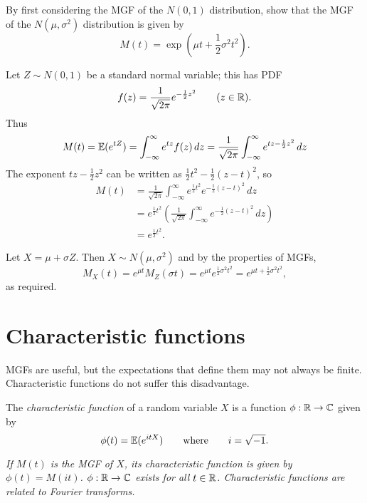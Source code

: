 \begin{example}
By first considering the MGF of the $N(0,1)$ distribution, show that the MGF of the $N(\mu,\sigma^2)$ distribution is given by
\[
M(t) = \exp\left(\mu t + \frac{1}{2}\sigma^2t^2\right).
\]
\end{example}

\begin{solution}
Let $Z\sim N(0,1)$ be a standard normal variable; this has PDF
\[
f(z) = \frac{1}{\sqrt{2\pi}}e^{-\frac{1}{2}z^2}\qquad (z\in\mathbb{R}).
\]
Thus
\[
M(t) = \mathbb{E}(e^{tZ})
	 = \int_{-\infty}^{\infty} e^{tz} f(z)\,dz 
	 = \frac{1}{\sqrt{2\pi}}\int_{-\infty}^{\infty} e^{tz-\frac{1}{2}z^2}\,dz 
\]
The exponent $tz-\frac{1}{2}z^2$ can be written as $\frac{1}{2}t^2 -\frac{1}{2}(z-t)^2$, so
\begin{align*}
M(t)
	& = \frac{1}{\sqrt{2\pi}}\int_{-\infty}^{\infty} e^{\frac{1}{2}t^2} e^{-\frac{1}{2}(z-t)^2}\,dz \\
	& = e^{\frac{1}{2}t^2} \left(\frac{1}{\sqrt{2\pi}}\int_{-\infty}^{\infty} e^{-\frac{1}{2}(z-t)^2}\,dz\right) \\
	& = e^{\frac{1}{2}t^2}.
\end{align*}

Let $X=\mu+\sigma Z$. Then $X\sim N(\mu,\sigma^2)$ and by the properties of MGFs,
\[
M_X(t) = e^{\mu t}M_Z(\sigma t) = e^{\mu t}e^{\frac{1}{2}\sigma^2t^2}= e^{\mu t + \frac{1}{2}\sigma^2t^2},
\]
as required.
\end{solution}

\section{Characteristic functions}

MGFs are useful, but the expectations that define them may not always be finite. Characteristic functions do not suffer this disadvantage.

\begin{definition}
The \emph{characteristic function} of a random variable $X$ is a function $\phi:\mathbb{R}\to\mathbb{C}$ given by 
\[
\phi(t) = \mathbb{E}(e^{itX}) \qquad\text{where}\qquad i=\sqrt{-1}.
\]
\end{definition}

\begin{remark}
\bit
\it If $M(t)$ is the MGF of $X$, its characteristic function is given by $\phi(t) = M(it)$.
\it $\phi:\mathbb{R}\to\mathbb{C}$ exists for all $t\in\mathbb{R}$.
\it Characteristic functions are related to \emph{Fourier transforms}.
\eit
\end{remark}



